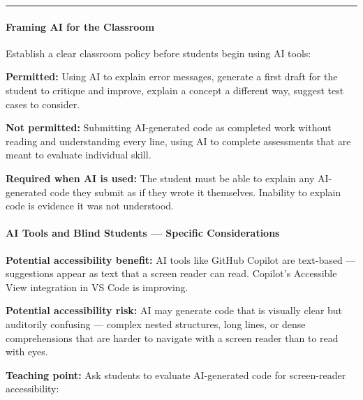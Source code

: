 \documentclass[
  justified,
  openright,
]{tufte-book}
\let\subsection\paragraph
\let\paragraph\paragraph
\let\subsection\paragraph
\let\paragraph\paragraph
\begin{document}
\begin{center}\rule{0.5\linewidth}{0.5pt}\end{center}



\subsection{Framing AI for the
Classroom}\label{framing-ai-for-the-classroom}

Establish a clear classroom policy before students begin using AI tools:

\textbf{Permitted:} Using AI to explain error messages, generate a first
draft for the student to critique and improve, explain a concept a
different way, suggest test cases to consider.

\textbf{Not permitted:} Submitting AI-generated code as completed work
without reading and understanding every line, using AI to complete
assessments that are meant to evaluate individual skill.

\textbf{Required when AI is used:} The student must be able to explain
any AI-generated code they submit as if they wrote it themselves.
Inability to explain code is evidence it was not understood.

\subsection{AI Tools and Blind Students --- Specific
Considerations}\label{ai-tools-and-blind-students-specific-considerations}

\textbf{Potential accessibility benefit:} AI tools like GitHub Copilot
are text-based --- suggestions appear as text that a screen reader can
read. Copilot's Accessible View integration in VS Code is improving.

\textbf{Potential accessibility risk:} AI may generate code that is
visually clear but auditorily confusing --- complex nested structures,
long lines, or dense comprehensions that are harder to navigate with a
screen reader than to read with eyes.

\textbf{Teaching point:} Ask students to evaluate AI-generated code for
screen-reader accessibility:
\end{document}
